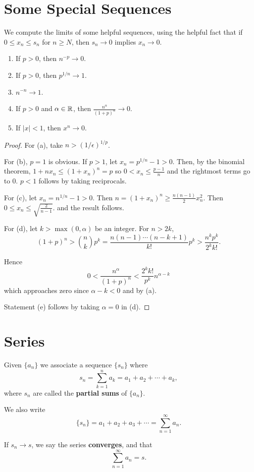 \section{Some Special Sequences}

\begin{theorem} %
We compute the limits of some helpful sequences, using the helpful fact that if $0 \le x_n \le s_n$ for $n \ge N$, then $s_n \to 0$ implies $x_n \to 0$. 

\begin{enumerate}
\item If $p > 0$, then $n^{-p} \to 0$.
\item If $p > 0$, then $p^{1/n} \to 1$.
\item $n^{-n} \to 1$.
\item If $p > 0$ and $\alpha \in \mathbb{R}$, then $\frac{n^{\alpha}}{(1 + p)^n} \to 0$. 
\item If $|x| < 1$, then $x^n \to 0$.
\end{enumerate}

\begin{proof}
For (a), take $n > (1/\epsilon)^{1/p}$.

For (b), $p = 1$ is obvious. If $p > 1$, let $x_n = p^{1/n} - 1 > 0$. Then, by the binomial theorem, $1 + nx_n \le (1 + x_n)^n = p$ so $0 < x_n \le \frac{p - 1}{n}$ and the rightmost terms go to 0. $p < 1$ follows by taking reciprocals.

For (c), let $x_n = n^{1/n} - 1 > 0$. Then $n = (1 + x_n)^n \ge \frac{n(n-1)}{2} x_n^2$. Then $0 \le x_n \le \sqrt{\frac{2}{n - 1}}$. and the result follows.

For (d), let $k > \max(0, \alpha)$ be an integer. For $n > 2k$, 
\[
	(1 + p)^n > \binom{n}{k} p^k = \frac{n(n - 1) \cdots (n - k + 1)}{k!} p^k > \frac{n^k p^k}{2^k k!}.
\]

Hence
\[
	0 < \frac{n^\alpha}{(1 + p)^n} < \frac{2^k k!}{p^k} n^{\alpha - k}
\]
which approaches zero since $\alpha - k < 0$ and by (a).

Statement (e) follows by taking $\alpha = 0$ in (d). 
\end{proof}
\end{theorem}

\section{Series}

\begin{definition} %
Given $\{a_n\}$ we associate a sequence $\{s_n\}$ where
\[
	s_n = \sum_{k=1}^{n} a_k = a_1 + a_2 + \dotsb + a_k,
\]
where $s_n$ are called the \textbf{partial sums} of $\{a_n\}$.

We also write
\[
	\{s_n\} = a_1 + a_2 + a_3 + \dotsb = \sum_{n=1}^{\infty} a_n.
\]

If $s_n \to s$, we say the series \textbf{converges}, and that
\[
	\sum_{n=1}^{\infty} a_n = s.
\]
\end{definition}

